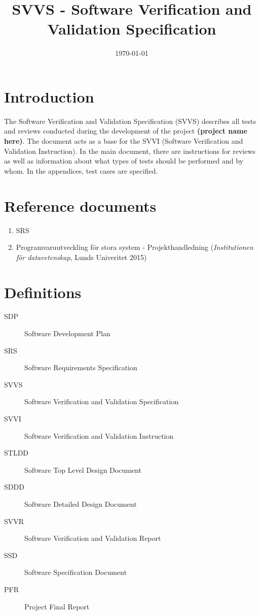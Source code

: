 \documentclass[a4paper]{article}
\title{SVVS - Software Verification and Validation Specification}
\date{\today}
\begin{document}
\maketitle


\pagebreak
\setcounter{tocdepth}{2}
\tableofcontents
\pagebreak


\section{Introduction}
The Software Verification and Validation Specification (SVVS) describes all tests and reviews conducted during the development of the project \textbf{(project name here)}. The document acts as a base for the SVVI (Software Verification and Validation Instruction).
In the main document, there are instructions for reviews as well as information about what types of tests should be performed and by whom. In the appendices, test cases are specified.

\section{Reference documents}
\begin{enumerate}
\item SRS \label{refdocs:srs}
\item Programvaruutveckling för stora system - Projekthandledning (\textit{Institutionen för datavetenskap}, Lunds Univeritet 2015) \label{refdocs:projekthandledning}
\end{enumerate}

\section{Definitions}
\begin{description}
\item[SDP] Software Development Plan
\item[SRS] Software Requirements Specification
\item[SVVS] Software Verification and Validation Specification
\item[SVVI] Software Verification and Validation Instruction
\item[STLDD] Software Top Level Design Document
\item[SDDD] Software Detailed Design Document
\item[SVVR] Software Verification and Validation Report
\item[SSD] Software Specification Document
\item[PFR] Project Final Report
\end{description}
\end{document}
